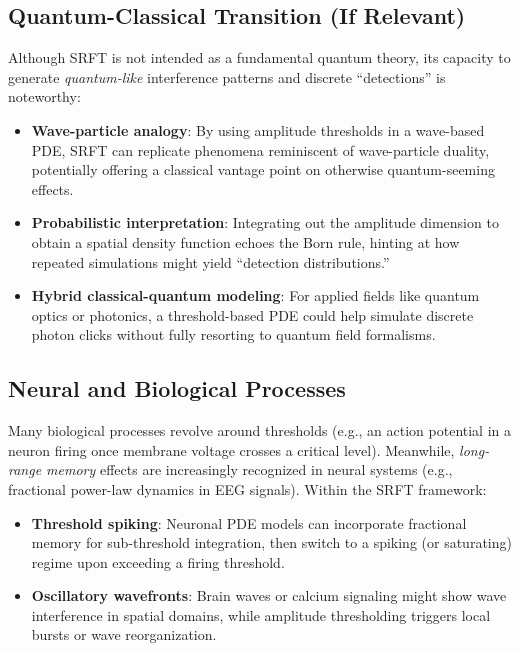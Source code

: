 \documentclass[12pt]{article}
\begin{document}
\subsection{Quantum-Classical Transition (If Relevant)}
\label{subsec:quantum_classical_transition}
Although SRFT is not intended as a fundamental quantum theory, its capacity to
generate \emph{quantum-like} interference patterns and discrete “detections” is
noteworthy:
\begin{itemize}
    \item \textbf{Wave-particle analogy}: By using amplitude thresholds in a
          wave-based PDE, SRFT can replicate phenomena reminiscent of wave-particle
          duality, potentially offering a classical vantage point on otherwise
          quantum-seeming effects.
    \item \textbf{Probabilistic interpretation}: Integrating out the amplitude
          dimension to obtain a spatial density function echoes the Born rule,
          hinting at how repeated simulations might yield “detection distributions.”
    \item \textbf{Hybrid classical-quantum modeling}: For applied fields like
          quantum optics or photonics, a threshold-based PDE could help simulate
          discrete photon clicks without fully resorting to quantum field formalisms.
\end{itemize}

\subsection{Neural and Biological Processes}
\label{subsec:neural_bio}
Many biological processes revolve around thresholds (e.g., an action potential
in a neuron firing once membrane voltage crosses a critical level). Meanwhile,
\emph{long-range memory} effects are increasingly recognized in neural systems
(e.g., fractional power-law dynamics in EEG signals). Within the SRFT framework:
\begin{itemize}
    \item \textbf{Threshold spiking}: Neuronal PDE models can incorporate fractional
          memory for sub-threshold integration, then switch to a spiking (or saturating)
          regime upon exceeding a firing threshold.
    \item \textbf{Oscillatory wavefronts}: Brain waves or calcium signaling might
          show wave interference in spatial domains, while amplitude thresholding
          triggers local bursts or wave reorganization.
\end{itemize}
\end{document}

